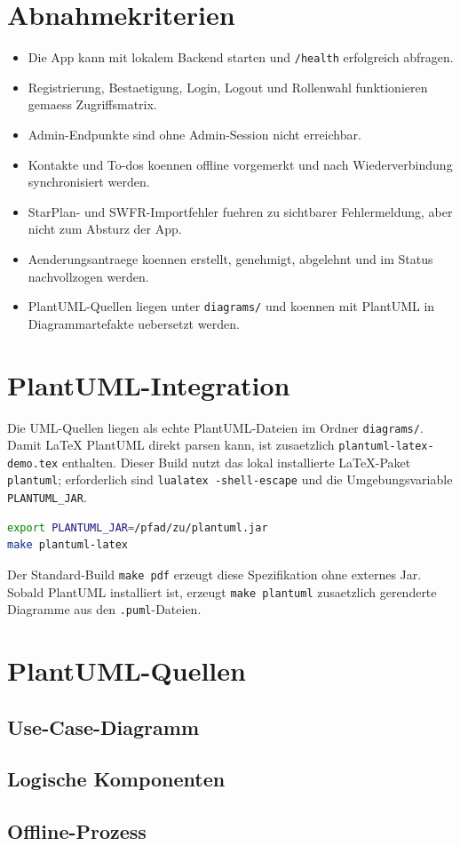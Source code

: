 \documentclass[11pt,a4paper]{article}
\begin{document}
\section{Abnahmekriterien}
\begin{itemize}
  \item Die App kann mit lokalem Backend starten und \texttt{/health} erfolgreich abfragen.
  \item Registrierung, Bestaetigung, Login, Logout und Rollenwahl funktionieren gemaess Zugriffsmatrix.
  \item Admin-Endpunkte sind ohne Admin-Session nicht erreichbar.
  \item Kontakte und To-dos koennen offline vorgemerkt und nach Wiederverbindung synchronisiert werden.
  \item StarPlan- und SWFR-Importfehler fuehren zu sichtbarer Fehlermeldung, aber nicht zum Absturz der App.
  \item Aenderungsantraege koennen erstellt, genehmigt, abgelehnt und im Status nachvollzogen werden.
  \item PlantUML-Quellen liegen unter \texttt{diagrams/} und koennen mit PlantUML in Diagrammartefakte uebersetzt werden.
\end{itemize}

\section{PlantUML-Integration}
Die UML-Quellen liegen als echte PlantUML-Dateien im Ordner \texttt{diagrams/}. Damit LaTeX PlantUML direkt parsen kann, ist zusaetzlich \texttt{plantuml-latex-demo.tex} enthalten. Dieser Build nutzt das lokal installierte LaTeX-Paket \texttt{plantuml}; erforderlich sind \texttt{lualatex -shell-escape} und die Umgebungsvariable \texttt{PLANTUML\_JAR}.

\begin{lstlisting}[language=bash]
export PLANTUML_JAR=/pfad/zu/plantuml.jar
make plantuml-latex
\end{lstlisting}

Der Standard-Build \texttt{make pdf} erzeugt diese Spezifikation ohne externes Jar. Sobald PlantUML installiert ist, erzeugt \texttt{make plantuml} zusaetzlich gerenderte Diagramme aus den \texttt{.puml}-Dateien.

\appendix
\section{PlantUML-Quellen}
\subsection{Use-Case-Diagramm}

\subsection{Logische Komponenten}

\subsection{Offline-Prozess}

\end{document}
